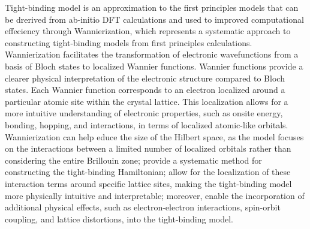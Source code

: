 Tight-binding model is an approximation to the first principles models that can be drerived from ab-initio DFT calculations and used to improved computational effeciency through Wannierization, which represents a systematic approach to constructing tight-binding models from first principles calculations. Wannierization facilitates the transformation of electronic wavefunctions from a basis of Bloch states to localized Wannier functions. Wannier functions provide a clearer physical interpretation of the electronic structure compared to Bloch states. Each Wannier function corresponds to an electron localized around a particular atomic site within the crystal lattice. This localization allows for a more intuitive understanding of electronic properties, such as onsite energy, bonding, hopping, and interactions, in terms of localized atomic-like orbitals. Wannierization can help educe the size of the Hilbert space, as the model focuses on the interactions between a limited number of localized orbitals rather than considering the entire Brillouin zone; provide a systematic method for constructing the tight-binding Hamiltonian; allow for the localization of these interaction terms around specific lattice sites, making the tight-binding model more physically intuitive and interpretable; moreover, enable the incorporation of additional physical effects, such as electron-electron interactions, spin-orbit coupling, and lattice distortions, into the tight-binding model.

